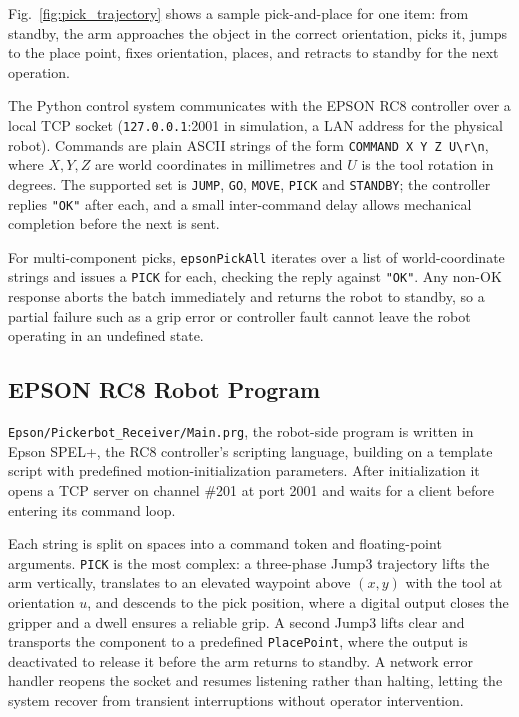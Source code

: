 \documentclass[conference]{IEEEtran}
\begin{document}
Fig.~\ref{fig:pick_trajectory} shows a sample pick-and-place for one item: from standby, the arm approaches the object in the correct orientation, picks it, jumps to the place point, fixes orientation, places, and retracts to standby for the next operation.

The Python control system communicates with the EPSON RC8 controller over a local TCP socket (\texttt{127.0.0.1}:2001 in simulation, a LAN address for the physical robot). Commands are plain ASCII strings of the form \texttt{COMMAND~X~Y~Z~U\textbackslash r\textbackslash n}, where $X,Y,Z$ are world coordinates in millimetres and $U$ is the tool rotation in degrees. The supported set is \texttt{JUMP}, \texttt{GO}, \texttt{MOVE}, \texttt{PICK} and \texttt{STANDBY}; the controller replies \texttt{"OK"} after each, and a small inter-command delay allows mechanical completion before the next is sent.

For multi-component picks, \texttt{epsonPickAll} iterates over a list of world-coordinate strings and issues a \texttt{PICK} for each, checking the reply against \texttt{"OK"}. Any non-OK response aborts the batch immediately and returns the robot to standby, so a partial failure such as a grip error or controller fault cannot leave the robot operating in an undefined state.

\subsection{EPSON RC8 Robot Program}
\label{sec:epson}

\texttt{Epson/Pickerbot\_Receiver/Main.prg}, the robot-side program is written in Epson SPEL+, the RC8 controller's scripting language, building on a template script \cite{prasetyo2024} with predefined motion-initialization parameters. After initialization it opens a TCP server on channel \#201 at port 2001 and waits for a client before entering its command loop.

Each string is split on spaces into a command token and floating-point arguments. \texttt{PICK} is the most complex: a three-phase Jump3 trajectory lifts the arm vertically, translates to an elevated waypoint above $(x, y)$ with the tool at orientation $u$, and descends to the pick position, where a digital output closes the gripper and a dwell ensures a reliable grip. A second Jump3 lifts clear and transports the component to a predefined \texttt{PlacePoint}, where the output is deactivated to release it before the arm returns to standby. A network error handler reopens the socket and resumes listening rather than halting, letting the system recover from transient interruptions without operator intervention.
\end{document}

